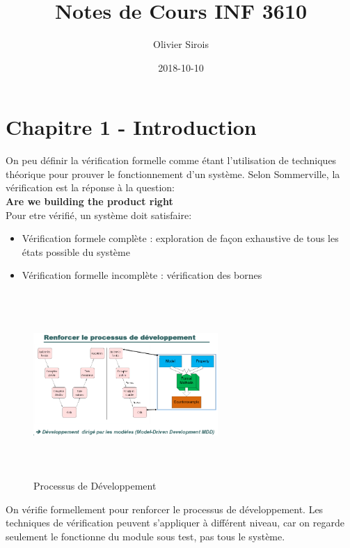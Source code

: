 \documentclass[oneside]{book}
\title{Notes de Cours INF 3610}
\date{2018-10-10}
\author{Olivier Sirois}
\begin{document}
    \setcounter{page}{1}
    \maketitle
    \tableofcontents
    \chapter{Chapitre 1 - Introduction}
    On peu définir la vérification formelle comme étant l'utilisation de techniques théorique pour prouver le fonctionnement d'un système. Selon Sommerville, la vérification est la réponse à la question:\\
    \textbf{Are we building the product right}\\
    
    Pour etre vérifié, un système doit satisfaire:
    \begin{itemize}
        \item Vérification formele complète : exploration de façon exhaustive de tous les états possible du système
        \item Vérification formelle incomplète : vérification des bornes
    \end{itemize}

    \begin{figure}[!ht]
    	\centering
    	\includegraphics[width = 7cm, height = 7cm, keepaspectratio]{Images/processus_de_developpement.png}
    	\caption{Processus de Développement}
    	\label{fig:ProcessusDeveloppement}
    \end{figure}
    On vérifie formellement pour renforcer le processus de développement. Les techniques de vérification peuvent s'appliquer à différent niveau, car on regarde seulement le fonctionne du module sous test, pas tous le système.\\
    
\end{document}
